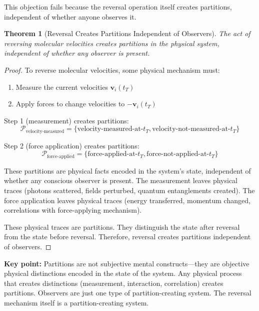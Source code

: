 \documentclass[twocolumn,10pt]{article}
\newtheorem{theorem}{Theorem}[section]
\theoremstyle{definition}
\theoremstyle{remark}
\begin{document}
\vspace{0.2cm}
\noindent This objection fails because the reversal operation itself creates partitions, independent of whether anyone observes it.

\begin{theorem}[Reversal Creates Partitions Independent of Observers]
\label{thm:reversal_creates_partitions}
The act of reversing molecular velocities creates partitions in the physical system, independent of whether any observer is present.
\end{theorem}

\begin{proof}
To reverse molecular velocities, some physical mechanism must:
\begin{enumerate}
\item Measure the current velocities $\mathbf{v}_i(t_T)$
\item Apply forces to change velocities to $-\mathbf{v}_i(t_T)$
\end{enumerate}

Step 1 (measurement) creates partitions:
\begin{equation}
\mathcal{P}_{\text{velocity-measured}} = \{\text{velocity-measured-at-}t_T, \text{velocity-not-measured-at-}t_T\}
\end{equation}

Step 2 (force application) creates partitions:
\begin{equation}
\mathcal{P}_{\text{force-applied}} = \{\text{force-applied-at-}t_T, \text{force-not-applied-at-}t_T\}
\end{equation}

These partitions are physical facts encoded in the system's state, independent of whether any conscious observer is present. The measurement leaves physical traces (photons scattered, fields perturbed, quantum entanglements created). The force application leaves physical traces (energy transferred, momentum changed, correlations with force-applying mechanism).

These physical traces are partitions. They distinguish the state after reversal from the state before reversal. Therefore, reversal creates partitions independent of observers.
\end{proof}

\noindent\textbf{Key point:} Partitions are not subjective mental constructs—they are objective physical distinctions encoded in the state of the system. Any physical process that creates distinctions (measurement, interaction, correlation) creates partitions. Observers are just one type of partition-creating system. The reversal mechanism itself is a partition-creating system.
\end{document}
